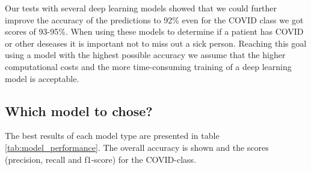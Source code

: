 \documentclass{article}
\begin{document}
Our tests with several deep learning models showed that we could further improve the accuracy of the predictions to 92\% even for the COVID class we got scores of 93-95\%. When using these models to determine if a patient has COVID or other deseases it is important not to miss out a sick person. Reaching this goal using a model with the highest possible accuracy we assume that the higher computational costs and the more time-consuming training of a deep learning model is acceptable.\\


\subsection{Which model to chose?}
The best results of each model type are presented in table \ref{tab:model_performance}. The overall accuracy is shown and the scores (precision, recall and f1-score) for the COVID-class. 
\end{document}
